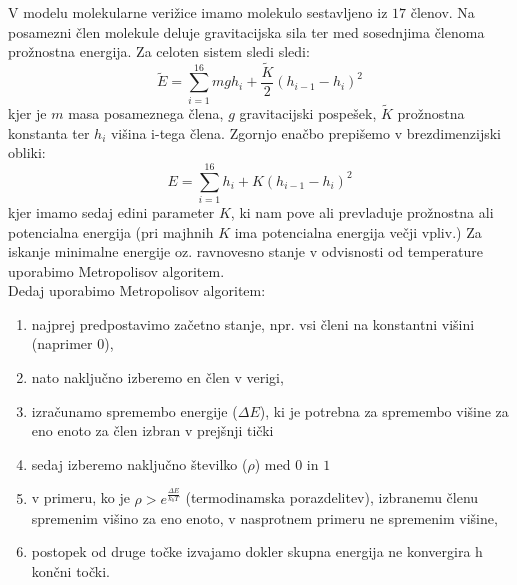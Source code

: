 \documentclass[slovene,11pt,a4paper]{article}
\numberwithin{equation}{section} %
\numberwithin{figure}{section} %
\numberwithin{table}{section} %
\begin{document}
V modelu molekularne verižice imamo molekulo sestavljeno iz $17$ členov. Na posamezni člen molekule deluje gravitacijska sila ter med sosednjima členoma prožnostna energija. Za celoten sistem sledi sledi:
\begin{equation}
\tilde{E}= \sum_{i=1}^{16} m g h_i +\frac{\tilde{K}}{2} (h_{i-1}-h_i)^2
\end{equation}
kjer je $m$ masa posameznega člena, $g$ gravitacijski pospešek, $\tilde{K}$ prožnostna konstanta ter $h_i$ višina i-tega člena. Zgornjo enačbo prepišemo v brezdimenzijski obliki:
\begin{equation}
E= \sum_{i=1}^{16} h_i +K (h_{i-1}-h_i)^2
\end{equation}
kjer imamo sedaj edini parameter $K$, ki nam pove ali prevladuje prožnostna ali potencialna energija (pri majhnih $K$ ima potencialna energija večji vpliv.)
Za iskanje minimalne energije oz. ravnovesno stanje v odvisnosti od temperature uporabimo Metropolisov algoritem.\\
Dedaj uporabimo Metropolisov algoritem:
\begin{enumerate}
\item najprej predpostavimo začetno stanje, npr. vsi členi na konstantni višini (naprimer $0$),
\item nato naključno izberemo en člen v verigi,
\item izračunamo spremembo energije ($\Delta E$), ki je potrebna za spremembo višine za eno enoto za člen izbran v prejšnji tički
\item sedaj izberemo naključno številko ($\rho$) med $0$ in $1$
\item v primeru, ko je $\rho>e^{\frac{\Delta E}{k_b T}}$ (termodinamska porazdelitev), izbranemu členu spremenim višino za eno enoto, v nasprotnem primeru ne spremenim višine,
\item postopek od druge točke izvajamo dokler skupna energija ne konvergira h končni točki.
\end{enumerate}
\end{document}

